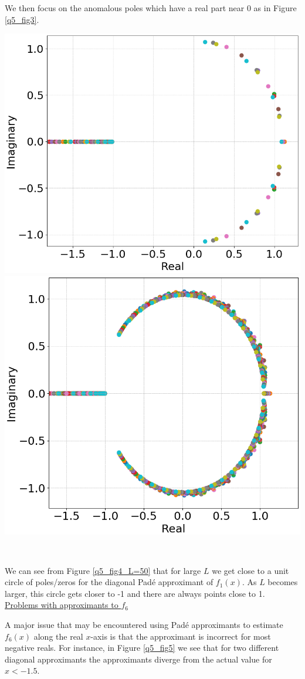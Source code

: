 \documentclass[12pt, a4paper]{article}
\begin{document}
\vspace{0.2cm}

We then focus on the anomalous poles which have a real part near 0 as in Figure \ref{q5_fig3}.

\vspace{0.3cm}
\begin{minipage}{\textwidth}
	\centering
	\includegraphics[width=0.51\linewidth]{q5_fig4_L=20}
	\includegraphics[width=0.48\linewidth]{q5_fig4_L=50}

	\vspace*{-0.2cm}

	\label{q5_fig4_L=50}
\end{minipage}
\\

\vspace{0.4cm}

We can see from Figure \ref{q5_fig4_L=50} that for large $L$ we get close to a unit circle
of poles/zeros for the diagonal Pad\'e approximant of $f_{1}(x)$. As $L$ becomes larger, this
circle gets closer to -1 and there are always points close to 1.
\\

\vspace{0.4cm}
\underline{Problems with approximants to $f_{6}$}

\vspace{0.5cm}
A major issue that may be encountered using Pad\'e approximants to estimate $f_{6}(x)$ along the
real $x$-axis is that the approximant is incorrect for most negative reals. For instance, in
Figure \ref{q5_fig5} we see that for two different diagonal approximants the approximants diverge
from the actual value for $x<-1.5$.\\
\end{document}
